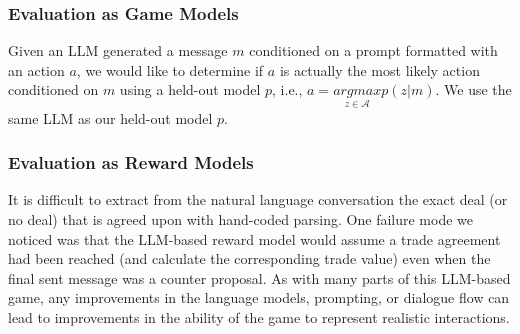 \documentclass[12pt]{article}
\begin{document}
\subsubsection*{Evaluation as Game Models}
Given an LLM generated a message $m$ conditioned on a prompt formatted with an action $a$, we would like to determine if $a$ is actually the most likely action conditioned on $m$ using a held-out
model $p$, i.e., $a = \underset{z\in \mathcal{A}}{argmax}p(z|m)$. We use the same LLM as our held-out model $p$.
\subsubsection*{Evaluation as Reward Models}
It is difficult to extract from the natural language conversation the
exact deal (or no deal) that is agreed upon with hand-coded parsing. One failure mode we noticed was that the LLM-based reward model would assume a trade
agreement had been reached (and calculate the corresponding trade value) even when the final sent
message was a counter proposal. As with many parts of this LLM-based game, any improvements
in the language models, prompting, or dialogue flow can lead to improvements in the ability of the
game to represent realistic interactions.
\end{document}
